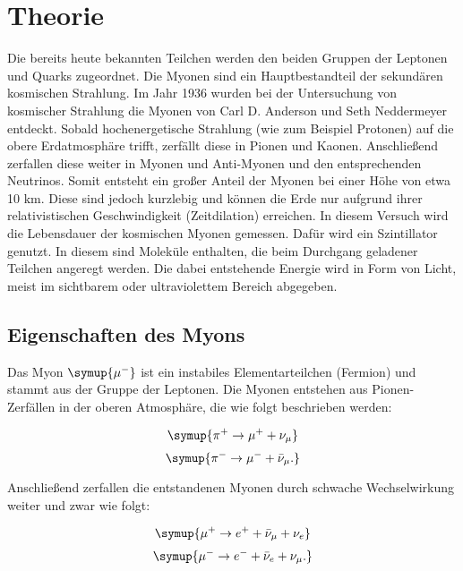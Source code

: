 \section{Theorie}
\label{sec:Theorie}

Die bereits heute bekannten Teilchen werden den beiden Gruppen der Leptonen und Quarks zugeordnet. \newline 
\noindent Die Myonen sind ein Hauptbestandteil der sekundären kosmischen Strahlung. Im Jahr 1936 wurden bei der Untersuchung von kosmischer Strahlung die Myonen von Carl D. Anderson und Seth Neddermeyer entdeckt. Sobald hochenergetische Strahlung (wie zum Beispiel Protonen) auf die obere Erdatmosphäre trifft, zerfällt diese in Pionen und Kaonen. Anschließend zerfallen diese weiter in Myonen und Anti-Myonen und den entsprechenden Neutrinos.\newline
\noindent Somit entsteht ein großer Anteil der Myonen bei einer Höhe von etwa 10 $\mathrm{km}$. Diese sind jedoch kurzlebig und können die Erde nur aufgrund ihrer relativistischen Geschwindigkeit (Zeitdilation) erreichen. In diesem Versuch wird die Lebensdauer der kosmischen Myonen gemessen. Dafür wird ein Szintillator genutzt. In diesem sind Moleküle enthalten, die beim Durchgang geladener Teilchen angeregt werden. Die dabei entstehende Energie wird in Form von Licht, meist im sichtbarem oder ultraviolettem Bereich abgegeben.

\subsection{Eigenschaften des Myons}
\label{sec:Eigenschaften}
Das Myon $\symup{\mu^{-}}$ ist ein instabiles Elementarteilchen (Fermion) und stammt aus der Gruppe der Leptonen.\newline
\noindent Die Myonen entstehen aus Pionen-Zerfällen in der oberen Atmosphäre, die wie folgt beschrieben werden:

\begin{equation}
\symup{\pi^{+} \rightarrow \mu^{+} + \nu_{\mu}}
\label{Pionzerfall1}
\end{equation}
\begin{equation}
\symup{\pi^{-} \rightarrow \mu^{-} + \bar{\nu}_{\mu}  .}
\label{Pionzerfall2}
\end{equation}

\noindent Anschließend zerfallen die entstandenen Myonen durch schwache Wechselwirkung weiter und zwar wie folgt:

\begin{equation}
\symup{\mu^{+} \rightarrow e^{+} + \bar{\nu}_{\mu} + \nu_{e}} 
\label{Pionzerfall3}
\end{equation}
\begin{equation}
\symup{\mu^{-} \rightarrow e^{-} + \bar{\nu}_{e} + \nu_{\mu}  .}
\label{Pionzerfall4}
\end{equation}


